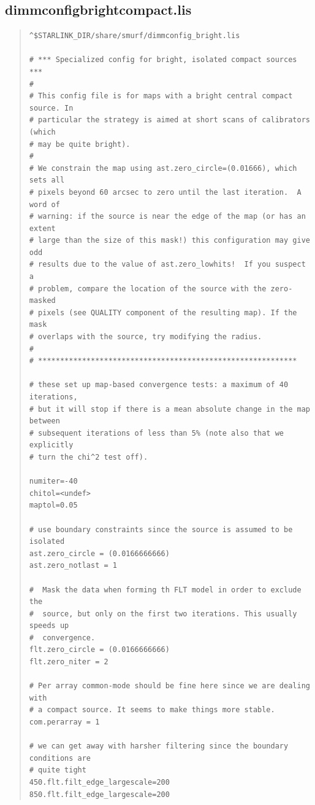 \documentclass[twoside,11pt]{article}
\renewcommand{\_}{\texttt{\symbol{95}}}
\newenvironment{myquote}{\begin{quote}\begin{small}}{\end{small}\end{quote}}
\begin{document}
\subsection{dimmconfig\_bright\_compact.lis}
\begin{myquote}
\begin{verbatim}
^$STARLINK_DIR/share/smurf/dimmconfig_bright.lis

# *** Specialized config for bright, isolated compact sources ***
#
# This config file is for maps with a bright central compact source. In
# particular the strategy is aimed at short scans of calibrators (which
# may be quite bright).
#
# We constrain the map using ast.zero_circle=(0.01666), which sets all
# pixels beyond 60 arcsec to zero until the last iteration.  A word of
# warning: if the source is near the edge of the map (or has an extent
# large than the size of this mask!) this configuration may give odd
# results due to the value of ast.zero_lowhits!  If you suspect a
# problem, compare the location of the source with the zero-masked
# pixels (see QUALITY component of the resulting map). If the mask
# overlaps with the source, try modifying the radius.
#
# ***********************************************************

# these set up map-based convergence tests: a maximum of 40 iterations,
# but it will stop if there is a mean absolute change in the map between
# subsequent iterations of less than 5% (note also that we explicitly
# turn the chi^2 test off).

numiter=-40
chitol=<undef>
maptol=0.05

# use boundary constraints since the source is assumed to be isolated
ast.zero_circle = (0.0166666666)
ast.zero_notlast = 1

#  Mask the data when forming th FLT model in order to exclude the
#  source, but only on the first two iterations. This usually speeds up
#  convergence.
flt.zero_circle = (0.0166666666)
flt.zero_niter = 2

# Per array common-mode should be fine here since we are dealing with
# a compact source. It seems to make things more stable.
com.perarray = 1

# we can get away with harsher filtering since the boundary conditions are
# quite tight
450.flt.filt_edge_largescale=200
850.flt.filt_edge_largescale=200
\end{verbatim}
\end{myquote}
\end{document}
